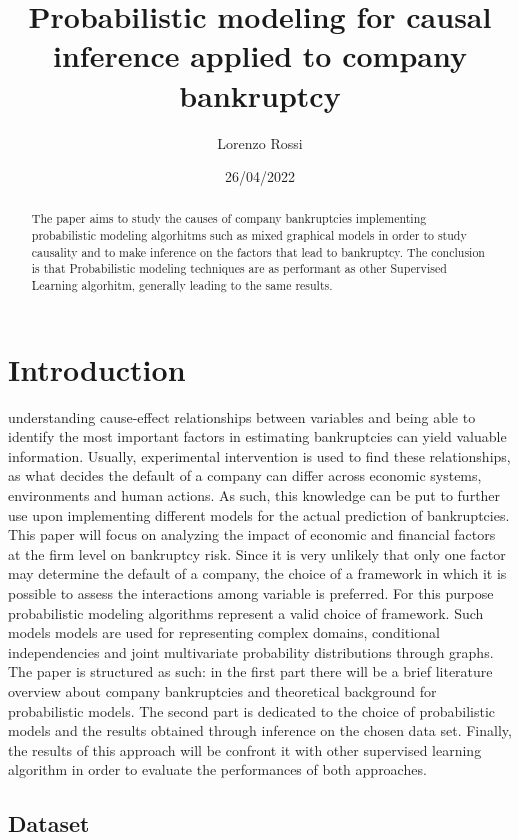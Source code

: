 \documentclass[
]{article}
\title{Probabilistic modeling for causal inference applied to company
bankruptcy}
\author{Lorenzo Rossi}
\date{26/04/2022}
\begin{document}
\maketitle
\begin{abstract}
The paper aims to study the causes of company bankruptcies implementing
probabilistic modeling algorhitms such as mixed graphical models in
order to study causality and to make inference on the factors that lead
to bankruptcy. The conclusion is that Probabilistic modeling techniques
are as performant as other Supervised Learning algorhitm, generally
leading to the same results.
\end{abstract}

\hypertarget{introduction}{%
\section{Introduction}\label{introduction}}

understanding cause-effect relationships between variables and being
able to identify the most important factors in estimating bankruptcies
can yield valuable information. Usually, experimental intervention is
used to find these relationships, as what decides the default of a
company can differ across economic systems, environments and human
actions. As such, this knowledge can be put to further use upon
implementing different models for the actual prediction of bankruptcies.
This paper will focus on analyzing the impact of economic and financial
factors at the firm level on bankruptcy risk. Since it is very unlikely
that only one factor may determine the default of a company, the choice
of a framework in which it is possible to assess the interactions among
variable is preferred. For this purpose probabilistic modeling
algorithms represent a valid choice of framework. Such models models are
used for representing complex domains, conditional independencies and
joint multivariate probability distributions through graphs. The paper
is structured as such: in the first part there will be a brief
literature overview about company bankruptcies and theoretical
background for probabilistic models. The second part is dedicated to the
choice of probabilistic models and the results obtained through
inference on the chosen data set. Finally, the results of this approach
will be confront it with other supervised learning algorithm in order to
evaluate the performances of both approaches.

\hypertarget{dataset}{%
\subsection{Dataset}\label{dataset}}
\end{document}
